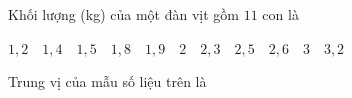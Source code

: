 \begin{ex}
Khối lượng (kg) của một đàn vịt gồm $11$ con là
\begin{center}
$1{,}2$\ \ $1{,}4$\ \ $1{,}5$\ \ $1{,}8$\ \ $1{,}9$\ \ $2$\ \ $2{,}3$\ \ $2{,}5$\ \ $2{,}6$\ \ $3$\ \ $3{,}2$
\end{center}
Trung vị của mẫu số liệu trên là
\end{ex}
